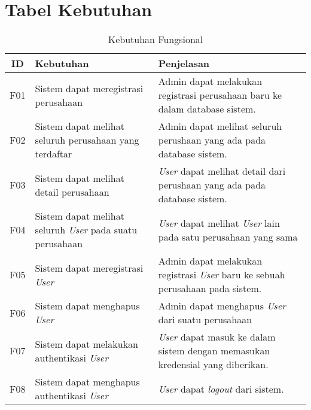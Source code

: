 \chapter{Tabel Kebutuhan}

\bgroup
\begin{table}[ht]
  \def\arraystretch{1.7}
  \caption{Kebutuhan Fungsional}
  \label{tab:kebutuhan-fungsional}
  \centering
  \begin{tabular}{|c|p{4.5cm}|p{8cm}|}
    \hline
    ID  & Kebutuhan                                                                      & Penjelasan                                                                                                      \\
    \hline
    F01 & Sistem dapat meregistrasi perusahaan                                           & Admin dapat melakukan registrasi perusahaan baru ke dalam database sistem.                                      \\
    \hline
    F02 & Sistem dapat melihat seluruh perusahaan yang terdaftar                         & Admin dapat melihat seluruh perushaan yang ada pada database sistem.                                            \\
    \hline
    F03 & Sistem dapat melihat detail perusahaan                                         & \textit{User} dapat melihat detail dari perushaan yang ada pada database sistem.                                \\
    \hline
    F04 & Sistem dapat melihat seluruh \textit{User} pada suatu perusahaan               & \textit{User} dapat melihat \textit{User} lain pada satu perusahaan yang sama                                   \\
    \hline
    F05 & Sistem dapat meregistrasi \textit{User}                                        & Admin dapat melakukan registrasi \textit{User} baru ke sebuah perusahaan pada sistem.                           \\
    \hline
    F06 & Sistem dapat menghapus \textit{User}                                           & Admin dapat menghapus \textit{User} dari suatu perusahaan                                                       \\
    \hline
    F07 & Sistem dapat melakukan authentikasi \textit{User}                              & \textit{User} dapat masuk ke dalam sistem dengan memasukan kredensial yang diberikan.                           \\
    \hline
    F08 & Sistem dapat menghapus authentikasi \textit{User}                              & \textit{User} dapat \textit{logout} dari sistem.                                                                \\

\end{tabular}
\end{table}
